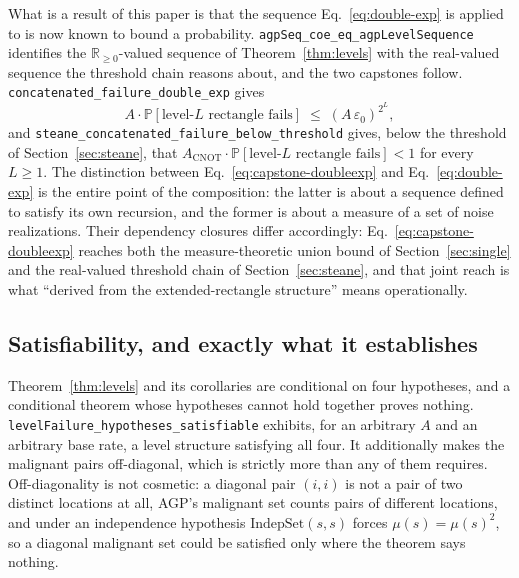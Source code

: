 \documentclass[aps,prx,reprint,nofootinbib,superscriptaddress]{revtex4-2}
\begin{document}
What is a result of this paper is that the sequence
Eq.~\eqref{eq:double-exp} is applied to is now known to bound a probability.
\texttt{agpSeq\_coe\_eq\_agpLevelSequence} identifies the
$\mathbb{R}_{\ge 0}$-valued sequence of Theorem~\ref{thm:levels} with the
real-valued sequence the threshold chain reasons about, and the two capstones
follow. \texttt{concatenated\_failure\_double\_exp} gives
\begin{equation}
  A \cdot \mathbb{P}\!\left[\text{level-}L\text{ rectangle fails}\right]
    \;\le\; \left(A\,\varepsilon_0\right)^{2^L},
  \label{eq:capstone-doubleexp}
\end{equation}
and \texttt{steane\_concatenated\_failure\_below\_threshold} gives, below the
threshold of Section~\ref{sec:steane}, that
$A_{\mathrm{CNOT}} \cdot \mathbb{P}[\text{level-}L\text{ rectangle fails}] < 1$
for every $L \ge 1$. The distinction between Eq.~\eqref{eq:capstone-doubleexp}
and Eq.~\eqref{eq:double-exp} is the entire point of the composition: the
latter is about a sequence defined to satisfy its own recursion, and the former
is about a measure of a set of noise realizations. Their dependency closures
differ accordingly: Eq.~\eqref{eq:capstone-doubleexp} reaches both the
measure-theoretic union bound of Section~\ref{sec:single} and the real-valued
threshold chain of Section~\ref{sec:steane}, and that joint reach is what
``derived from the extended-rectangle structure'' means operationally.


\subsection{Satisfiability, and exactly what it establishes}

Theorem~\ref{thm:levels} and its corollaries are conditional on four
hypotheses, and a conditional theorem whose hypotheses cannot hold together
proves nothing. \texttt{levelFailure\_hypotheses\_satisfiable} exhibits, for an
arbitrary $A$ and an arbitrary base rate, a level structure satisfying all
four. It additionally makes the malignant pairs off-diagonal, which is strictly
more than any of them requires. Off-diagonality is not cosmetic: a diagonal pair
$(i,i)$ is not a pair of two distinct locations at all, AGP's malignant set
counts pairs of different locations, and under an independence hypothesis
$\mathrm{IndepSet}(s,s)$ forces $\mu(s) = \mu(s)^2$, so a diagonal malignant set
could be satisfied only where the theorem says nothing.
\end{document}
